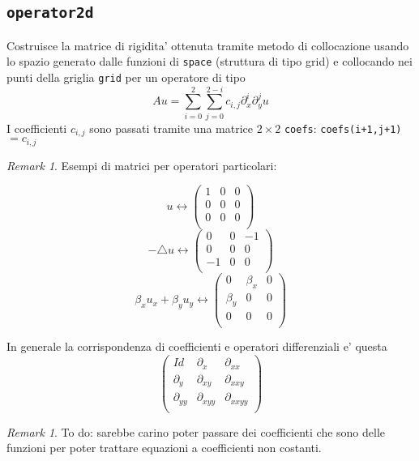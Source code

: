 \documentclass{amsart}
\theoremstyle{definition}
\theoremstyle{remark}
\newtheorem{rem}[thm]{Remark}
\numberwithin{equation}{section}
\begin{document}
\subsection*{\tt operator2d} Costruisce la matrice di rigidita' ottenuta tramite metodo di collocazione usando lo spazio generato dalle funzioni di {\tt space} (struttura di tipo grid) e collocando nei punti della griglia {\tt grid} per un operatore di tipo
\[
Au = \sum_{i=0}^{2} \sum_{j=0}^{2-i} c_{i,j} \partial_x^i \partial_y^j u
\]
I coefficienti $c_{i,j}$ sono passati tramite una matrice $2\times 2$ {\tt coefs}: {\tt coefs(i+1,j+1)}$=c_{i,j}$
\begin{rem}
Esempi di matrici per operatori particolari:

\[
 u \leftrightarrow
\left(
  \begin{array}{ccc}
    1 & 0 & 0 \\
    0 & 0 & 0 \\
    0 & 0 & 0 \\
  \end{array}
\right)
\]
\[
-\triangle u \leftrightarrow \left(
  \begin{array}{ccc}
    0 & 0 & -1 \\
    0 & 0 & 0 \\
    -1 & 0 & 0 \\
  \end{array}
\right)
\]
\[
\beta_x u_x + \beta_y u_y \leftrightarrow \left(
  \begin{array}{ccc}
    0 & \beta_x & 0 \\
    \beta_y & 0 & 0 \\
    0 & 0 & 0 \\
  \end{array}
\right)
\]


In generale la corrispondenza di coefficienti e operatori differenziali e' questa
\[
\left(
  \begin{array}{ccc}
    Id & \partial_x & \partial_{xx} \\
    \partial_y & \partial_{xy} & \partial_{xxy} \\
    \partial_{yy} & \partial_{xyy} & \partial_{xxyy} \\
  \end{array}
\right)
\]

\begin{rem}To do: sarebbe carino poter passare dei coefficienti che sono delle funzioni per poter trattare equazioni a coefficienti non costanti.\end{rem}
\end{rem}


%
%
\end{document}
